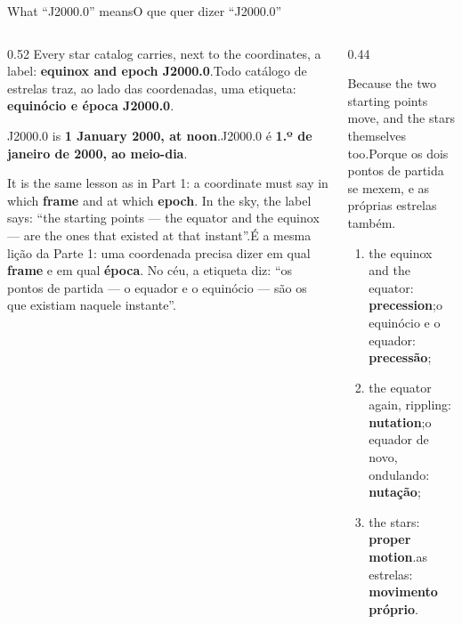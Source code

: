 \documentclass[aspectratio=169,11pt]{beamer}
\newcommand{\tr}[2]{\ifEN#2\else#1\fi}
\newcommand{\bnum}[1]{\textbf{\textcolor{mTeal}{#1}}}
\begin{document}
\begin{frame}{\tr{O que quer dizer ``J2000.0''}{What ``J2000.0'' means}}
  \begin{columns}[T]
    \begin{column}{0.52\textwidth}
      \small
      \tr{Todo catálogo de estrelas traz, ao lado das coordenadas, uma etiqueta: \bnum{equinócio
      e época J2000.0}.}{Every star catalog carries, next to the coordinates, a label:
      \bnum{equinox and epoch J2000.0}.}
      \medskip

      \tr{J2000.0 é \bnum{1.º de janeiro de 2000, ao meio-dia}.}{J2000.0 is \bnum{1 January
      2000, at noon}.}
      \medskip

      \tr{É a mesma lição da Parte 1: uma coordenada precisa dizer em qual \bnum{frame} e em
      qual \bnum{época}. No céu, a etiqueta diz: ``os pontos de partida --- o equador e o
      equinócio --- são os que existiam naquele instante''.}{It is the same lesson as in Part 1:
      a coordinate must say in which \bnum{frame} and at which \bnum{epoch}. In the sky, the
      label says: ``the starting points --- the equator and the equinox --- are the ones that
      existed at that instant''.}
    \end{column}
    \begin{column}{0.44\textwidth}
      \begin{armadilha}[title={\tr{Por que a etiqueta é necessária}{Why the label is needed}}]
        \footnotesize\tr{Porque os \alert{dois pontos de partida se mexem}, e as
        \alert{próprias estrelas também}.}{Because the \alert{two starting points move}, and the
        \alert{stars themselves too}.}
      \end{armadilha}
      \smallskip
      \begin{ideia}[title={\tr{Três coisas se mexem}{Three things move}}]
        \footnotesize
        \begin{enumerate}
          \setlength{\itemsep}{2pt}
          \item \tr{o equinócio e o equador: \bnum{precessão};}{the equinox and the equator:
                \bnum{precession};}
          \item \tr{o equador de novo, ondulando: \bnum{nutação};}{the equator again,
                rippling: \bnum{nutation};}
          \item \tr{as estrelas: \bnum{movimento próprio}.}{the stars: \bnum{proper
                motion}.}
        \end{enumerate}
      \end{ideia}
    \end{column}
  \end{columns}
\end{frame}
\end{document}
